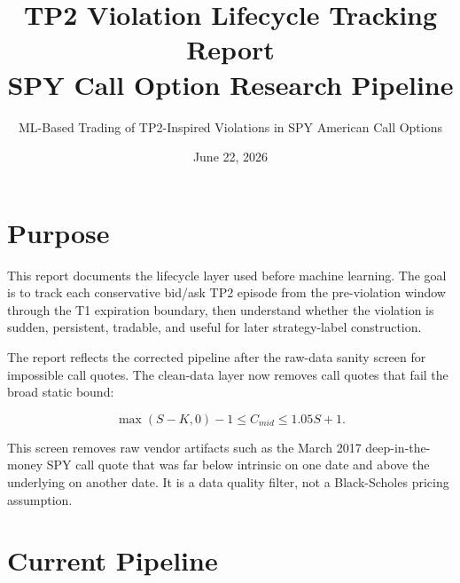 \documentclass[11pt]{article}
\title{TP2 Violation Lifecycle Tracking Report\\\large SPY Call Option Research Pipeline}
\author{ML-Based Trading of TP2-Inspired Violations in SPY American Call Options}
\date{June 22, 2026}
\begin{document}
\maketitle

\section{Purpose}

This report documents the lifecycle layer used before machine learning. The goal is to track each
conservative bid/ask TP2 episode from the pre-violation window through the T1 expiration boundary,
then understand whether the violation is sudden, persistent, tradable, and useful for later
strategy-label construction.

The report reflects the corrected pipeline after the raw-data sanity screen for impossible call
quotes. The clean-data layer now removes call quotes that fail the broad static bound:

\[
\max(S-K,0)-1 \le C_{mid} \le 1.05S+1.
\]

This screen removes raw vendor artifacts such as the March 2017 deep-in-the-money SPY call quote
that was far below intrinsic on one date and above the underlying on another date. It is a data
quality filter, not a Black-Scholes pricing assumption.

\section{Current Pipeline}
\end{document}
